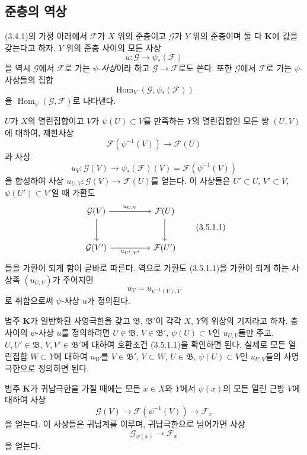 \subsection{준층의 역상}
\label{subsection:0.3.5-ko}

\begin{env}[3.5.1]
\label{0.3.5.1-ko}
(3.4.1)의 가정 아래에서 $\mathcal F$가 $X$ 위의 준층이고 $\mathcal G$가 $Y$ 위의 준층이며 둘 다 $\mathbf K$에 값을 갖는다고 하자. $Y$ 위의 준층 사이의 모든 사상
\[
  u:\mathcal G\longrightarrow\psi_*(\mathcal F)
\]
을 역시 $\mathcal G$에서 $\mathcal F$로 가는 $\psi$-\emph{사상}이라 하고 $\mathcal G\to\mathcal F$로도 쓴다. 또한 $\mathcal G$에서 $\mathcal F$로 가는 $\psi$-사상들의 집합
\[
  \operatorname{Hom}_Y(\mathcal G,\psi_*(\mathcal F))
\]
을 $\operatorname{Hom}_\psi(\mathcal G,\mathcal F)$로 나타낸다.

$U$가 $X$의 열린집합이고 $V$가 $\psi(U)\subset V$를 만족하는 $Y$의 열린집합인 모든 쌍 $(U,V)$에 대하여, 제한사상
\[
  \mathcal F(\psi^{-1}(V))\longrightarrow\mathcal F(U)
\]
과 사상
\[
  u_V:\mathcal G(V)\longrightarrow
  \psi_*(\mathcal F)(V)=\mathcal F(\psi^{-1}(V))
\]
을 합성하여 사상 $u_{U,V}:\mathcal G(V)\to\mathcal F(U)$를 얻는다. 이 사상들은 $U'\subset U$, $V'\subset V$, $\psi(U')\subset V'$일 때 가환도
\begin{equation*}
\begin{tikzcd}[column sep=huge,row sep=large]
\mathcal G(V) \arrow[r,"u_{U,V}"] \arrow[d]
  & \mathcal F(U) \arrow[d] \\
\mathcal G(V') \arrow[r,"u_{U',V'}"']
  & \mathcal F(U')
\end{tikzcd}
\tag{3.5.1.1}\label{0.3.5.1.1-ko}
\end{equation*}
들을 가환이 되게 함이 곧바로 따른다. 역으로 가환도 (3.5.1.1)을 가환이 되게 하는 사상족 $(u_{U,V})$가 주어지면
\[
  u_V=u_{\psi^{-1}(V),V}
\]
로 취함으로써 $\psi$-사상 $u$가 정의된다.


범주 $\mathbf K$가 일반화된 사영극한을 갖고 $\mathfrak B$, $\mathfrak B'$이 각각 $X$, $Y$의 위상의 기저라고 하자. 층 사이의 $\psi$-사상 $u$를 정의하려면 $U\in\mathfrak B$, $V\in\mathfrak B'$, $\psi(U)\subset V$인 $u_{U,V}$들만 주고, $U,U'\in\mathfrak B$, $V,V'\in\mathfrak B'$에 대하여 호환조건 (3.5.1.1)을 확인하면 된다. 실제로 모든 열린집합 $W\subset Y$에 대하여 $u_W$를 $V\in\mathfrak B'$, $V\subset W$, $U\in\mathfrak B$, $\psi(U)\subset V$인 $u_{U,V}$들의 사영극한으로 정의하면 된다.

범주 $\mathbf K$가 귀납극한을 가질 때에는 모든 $x\in X$와 $Y$에서 $\psi(x)$의 모든 열린 근방 $V$에 대하여 사상
\[
  \mathcal G(V)\longrightarrow
  \mathcal F(\psi^{-1}(V))\longrightarrow\mathcal F_x
\]
을 얻는다. 이 사상들은 귀납계를 이루며, 귀납극한으로 넘어가면 사상
\[
  \mathcal G_{\psi(x)}\longrightarrow\mathcal F_x
\]
을 얻는다.
\end{env}

